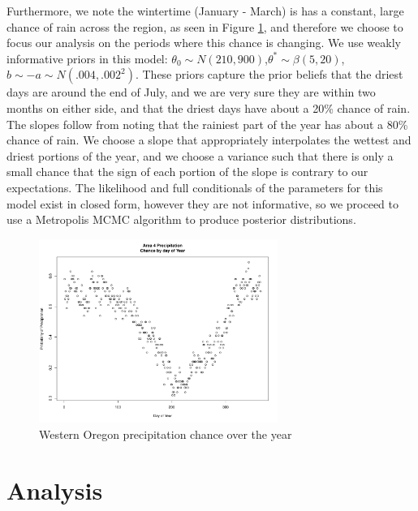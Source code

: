 \documentclass{article}
\begin{document}
Furthermore, we note the wintertime (January - March) is has a constant, large chance of rain across the region, as seen in Figure \ref{fig:area4}, and therefore we choose to focus our analysis on the periods where this chance is changing. 
We use weakly informative priors in this model: $\theta_0 \sim N(210,900)$,$\theta^* \sim \beta(5,20)$, $b \sim -a \sim N(.004,.002^2)$. These priors capture the prior beliefs that the driest days are around the end of July, and we are very sure they are within two months on either side, and that the driest days have about a 20\% chance of rain. 
The slopes follow from noting that the rainiest part of the year has about a 80\% chance of rain. We choose a slope that appropriately interpolates the wettest and driest portions of the year, and we choose a variance such that there is only a small chance that the sign of each portion of the slope is contrary to our expectations.
The likelihood and full conditionals of the parameters for this model exist in closed form, however they are not informative, so we proceed to use a Metropolis MCMC algorithm to produce posterior distributions.

\begin{figure}[h!]
\centering
\includegraphics[width = .4\textwidth, height = 6cm]{Area4PrecipByDay}
\caption{Western Oregon precipitation chance over the year}
\label{fig:area4}
\end{figure}


\section{Analysis}
\end{document}
